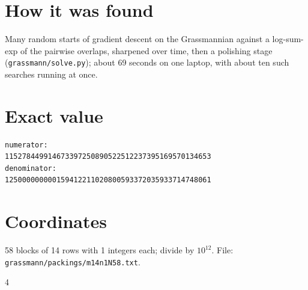 \documentclass[11pt,a4paper]{article}
\begin{document}
\section{How it was found}
Many random starts of gradient descent on the Grassmannian against a log-sum-exp of the pairwise overlaps, sharpened over time, then a polishing stage (\texttt{grassmann/solve.py}); about 69 seconds on one laptop, with about ten such searches running at once.


\appendix
\section{Exact value}
{\small
\begin{verbatim}
numerator:
115278449914673397250890522512237395169570134653
denominator:
125000000000159412211020800593372035933714748061
\end{verbatim}}

\section{Coordinates}
58 blocks of 14 rows with 1 integers each; divide by $10^{12}$. File: \texttt{grassmann/packings/m14n1N58.txt}.
{\tiny
\begin{multicols}{4}
\end{multicols}}
\end{document}
